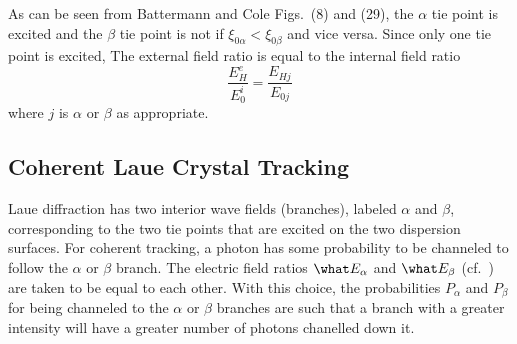As can be seen from Battermann and Cole Figs.~(8) and (29), the $\alpha$ tie point is excited and
the $\beta$ tie point is not if $\xi_{0\alpha} < \xi_{0\beta}$ and vice versa. Since only one tie
point is excited, The external field ratio is equal to the internal field ratio
\begin{equation}
  \frac{E_H^e}{E_0^i} = \frac{E_{Hj}}{E_{0j}}
\end{equation}
where $j$ is $\alpha$ or $\beta$ as appropriate.

\subsection{Coherent Laue Crystal Tracking}
\label{s:coherent.laue}

Laue diffraction has two interior wave fields (branches), labeled $\alpha$ and $\beta$,
corresponding to the two tie points that are excited on the two dispersion surfaces. For coherent
tracking, a photon has some probability to be channeled to follow the $\alpha$ or $\beta$
branch. The electric field ratios $\what E_\alpha$ and $\what E_\beta$ (cf.~) are taken to
be equal to each other. With this choice, the probabilities $P_\alpha$ and $P_\beta$ for being
channeled to the $\alpha$ or $\beta$ branches are such that a branch with a greater intensity will
have a greater number of photons chanelled down it.

